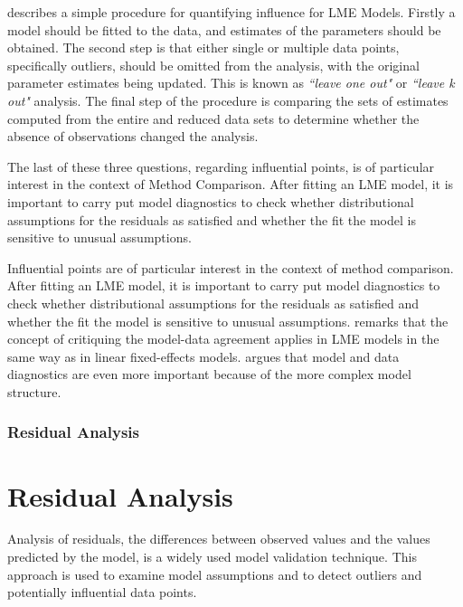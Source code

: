 \documentclass[12pt, a4paper]{report}
\theoremstyle{definition}
\theoremstyle{remark}
\begin{document}
\citet{schabenberger} describes a simple procedure for quantifying influence for LME Models. Firstly a model should be fitted to the data, and estimates of the parameters should be obtained. The second step is that either single or multiple data points, specifically outliers, should be omitted from the analysis, with the original parameter estimates being updated. This is known as \textit{``leave one out"} or \textit{``leave k out"} analysis. The final step of the procedure is comparing the sets of estimates computed from the entire and reduced data sets to determine whether the absence of observations changed the analysis. 

	The last of these three questions, regarding influential points, is of particular interest in the context of Method Comparison. After fitting an LME model, it is important to carry put model diagnostics to check whether distributional assumptions for the residuals as satisfied and whether the fit the model is sensitive to unusual assumptions. 


Influential points are of particular interest in the context of method comparison. After fitting an LME model, it is important to carry put model diagnostics to check whether distributional assumptions for the residuals as satisfied and whether the fit the model is sensitive to unusual assumptions. \citet{schabenberger} remarks that the concept of critiquing the model-data agreement applies in LME models in the same way as in linear fixed-effects models. \citet{west} argues that model and data diagnostics are even more important because of the more complex model structure.








\subsubsection{Residual Analysis}

	
\section{Residual Analysis}
Analysis of residuals, the differences between observed values and the values predicted by the model, is a widely used model validation technique. This approach is used to examine model assumptions and to detect outliers and potentially influential data points. 
\end{document}
